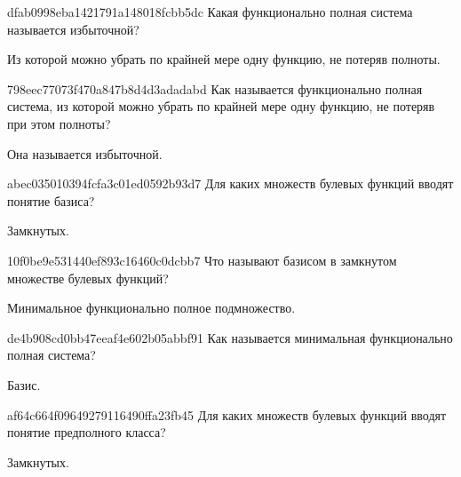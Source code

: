 \begin{note}{dfab0998eba1421791a148018fcbb5dc}
    Какая функционально полная система называется избыточной?

    \begin{cloze}{1}
        Из которой можно убрать по крайней мере одну функцию, не потеряв полноты.
    \end{cloze}
\end{note}

\begin{note}{798eec77073f470a847b8d4d3adadabd}
    Как называется функционально полная система, из которой можно убрать по крайней мере одну функцию, не потеряв при этом полноты?

    \begin{cloze}{1}
        Она называется избыточной.
    \end{cloze}
\end{note}

\begin{note}{abec035010394fcfa3c01ed0592b93d7}
    Для каких множеств булевых функций вводят понятие базиса?

    \begin{cloze}{1}
        Замкнутых.
    \end{cloze}
\end{note}

\begin{note}{10f0be9e531440ef893c16460c0dcbb7}
    Что называют базисом в замкнутом множестве булевых функций?

    \begin{cloze}{1}
        Минимальное функционально полное подмножество.
    \end{cloze}
\end{note}

\begin{note}{de4b908cd0bb47eeaf4e602b05abbf91}
    Как называется минимальная функционально полная система?

    \begin{cloze}{1}
        Базис.
    \end{cloze}
\end{note}

\begin{note}{af64c664f09649279116490ffa23fb45}
    Для каких множеств булевых функций вводят понятие предполного класса?

    \begin{cloze}{1}
        Замкнутых.
    \end{cloze}
\end{note}

